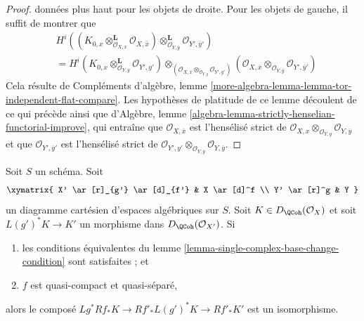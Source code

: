 \begin{proof}
données plus haut pour les objets de droite.
Pour les objets de gauche, il suffit de montrer que
\begin{align*}
&
H^i\left(
(K_{0, x}
\otimes_{\mathcal{O}_{X, x}}^\mathbf{L} \mathcal{O}_{X, \overline{x}})
\otimes_{\mathcal{O}_{Y, \overline{y}}}^\mathbf{L}
\mathcal{O}_{Y', \overline{y}'}\right) \\
& =
H^i(K_{0, x} \otimes_{\mathcal{O}_{Y, y}}^\mathbf{L} \mathcal{O}_{Y', y'})
\otimes_{(\mathcal{O}_{X, x} \otimes_{\mathcal{O}_{Y, y}} \mathcal{O}_{Y', y'})}
(\mathcal{O}_{X, \overline{x}}
\otimes_{\mathcal{O}_{Y, \overline{y}}}
\mathcal{O}_{Y', \overline{y}'})
\end{align*}
Cela résulte de Compléments d'algèbre, lemme
\ref{more-algebra-lemma-lemma-tor-independent-flat-compare}.
Les hypothèses de platitude de ce lemme découlent de ce qui précède
ainsi que d'Algèbre, lemme
\ref{algebra-lemma-strictly-henselian-functorial-improve},
qui entraîne que
$\mathcal{O}_{X, \overline{x}}$ est l'hensélisé strict de
$\mathcal{O}_{X, x} \otimes_{\mathcal{O}_{Y, y}}
\mathcal{O}_{Y, \overline{y}}$
et que
$\mathcal{O}_{Y', \overline{y}'}$ est l'hensélisé strict de
$\mathcal{O}_{Y', y'} \otimes_{\mathcal{O}_{Y, y}}
\mathcal{O}_{Y, \overline{y}}$.
\end{proof}

\begin{lemma}
\label{lemma-single-complex-base-change}
Soit $S$ un schéma. Soit
$$
\xymatrix{
X' \ar[r]_{g'} \ar[d]_{f'} &
X \ar[d]^f \\
Y' \ar[r]^g &
Y
}
$$
un diagramme cartésien d'espaces algébriques sur $S$.
Soit $K \in D_\QCoh(\mathcal{O}_X)$ et soit $L(g')^*K \to K'$
un morphisme dans $D_\QCoh(\mathcal{O}_{X'})$. Si
\begin{enumerate}
\item les conditions équivalentes du
lemme \ref{lemma-single-complex-base-change-condition} sont satisfaites ; et
\item $f$ est quasi-compact et quasi-séparé,
\end{enumerate}
alors le composé $Lg^*Rf_*K \to Rf'_*L(g')^*K \to Rf'_*K'$
est un isomorphisme.
\end{lemma}

